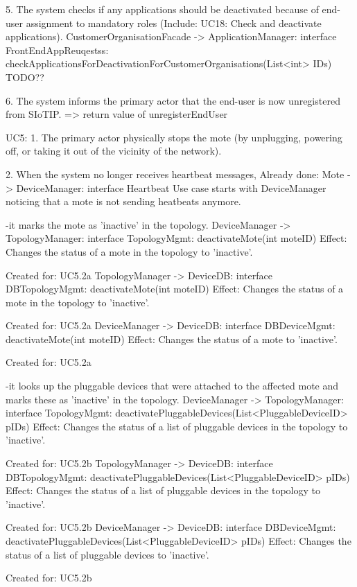         5. The system checks if any applications should be deactivated because of end-user assignment to mandatory roles (Include: UC18: Check and deactivate applications).
            CustomerOrganisationFacade -> ApplicationManager: interface FrontEndAppReuqestss: checkApplicationsForDeactivationForCustomerOrganisations(List<int> IDs)
                TODO??

        6. The system informs the primary actor that the end-user is now unregistered from SIoTIP.
            => return value of unregisterEndUser


    UC5:
        1. The primary actor physically stops the mote (by unplugging, powering off, or taking it out of the vicinity of the network).

        2. When the system no longer receives heartbeat messages,
            Already done: Mote -> DeviceManager: interface Heartbeat
            Use case starts with DeviceManager noticing that a mote is not sending heatbeats anymore.

            -it marks the mote as 'inactive' in the topology.
                DeviceManager -> TopologyManager: interface TopologyMgmt: deactivateMote(int moteID)
                    Effect: Changes the status of a mote in the topology to 'inactive'.
                    \item Created for: UC5.2a
                TopologyManager -> DeviceDB: interface DBTopologyMgmt: deactivateMote(int moteID)
                    Effect: Changes the status of a mote in the topology to 'inactive'.
                    \item Created for: UC5.2a
                DeviceManager -> DeviceDB: interface DBDeviceMgmt: deactivateMote(int moteID)
                    Effect: Changes the status of a mote to 'inactive'.
                    \item Created for: UC5.2a

            -it looks up the pluggable devices that were attached to the affected mote and marks these as 'inactive' in the topology.
                DeviceManager -> TopologyManager: interface TopologyMgmt: deactivatePluggableDevices(List<PluggableDeviceID> pIDs)
                    Effect: Changes the status of a list of pluggable devices in the topology to 'inactive'.
                    \item Created for: UC5.2b
                TopologyManager -> DeviceDB: interface DBTopologyMgmt: deactivatePluggableDevices(List<PluggableDeviceID> pIDs)
                    Effect: Changes the status of a list of pluggable devices in the topology to 'inactive'.
                    \item Created for: UC5.2b
                DeviceManager -> DeviceDB: interface DBDeviceMgmt: deactivatePluggableDevices(List<PluggableDeviceID> pIDs)
                    Effect: Changes the status of a list of pluggable devices to 'inactive'.
                    \item Created for: UC5.2b

